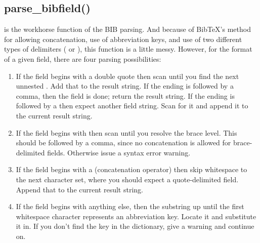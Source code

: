 \documentclass[letterpaper,10pt,english]{sphinxmanual}
\begin{document}
\subsection{parse\_bibfield()}
\label{\detokenize{developer_guide:parse-bibfield}}
 is the workhorse function of the BIB parsing. And because of BibTeX’s method for allowing concatenation, use of abbreviation keys, and use of two different types of delimiters ( or ), this function is a little messy. However, for the format of a given field, there are four parsing possibilities:
\begin{enumerate}
\item {} 
If the field begins with a double quote  then scan until you find the next unnested . Add that to the result string. If the ending  is followed by a comma, then the field is done; return the result string. If the ending is followed by a \sphinxcode{\sphinxupquote{\#}} then expect another field string. Scan for it and append it to the current result string.

\item {} 
If the field begins with \sphinxcode{\sphinxupquote{\{}} then scan until you resolve the brace level. This should be followed by a comma, since no concatenation is allowed for brace-delimited fields. Otherwise issue a syntax error warning.

\item {} 
If the field begins with a \sphinxcode{\sphinxupquote{\#}} (concatenation operator) then skip whitespace to the next character set, where you should expect a quote-delimited field. Append that to the current result string.

\item {} 
If the field begins with anything else, then the substring up until the first whitespace character represents an abbreviation key. Locate it and substitute it in. If you don’t find the key in the  dictionary, give a warning and continue on.

\end{enumerate}
\end{document}
